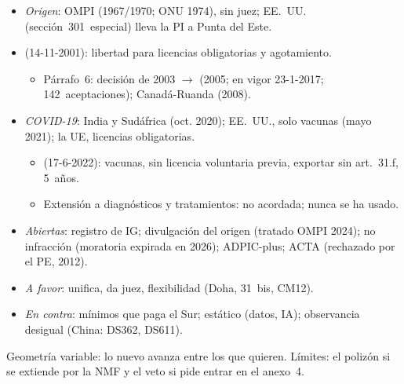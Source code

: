 \documentclass{article}
\begin{document}
\begin{columnas}
\begin{itemize}
\item \emph{Origen}: OMPI (1967/1970; ONU 1974), sin juez; EE.~UU. (sección~301~especial) lleva la PI a Punta del Este.
\item {} (14-11-2001): libertad para licencias obligatorias y agotamiento.
  \begin{itemize}
  \item Párrafo~6: decisión de 2003 $\to$  (2005; en vigor 23-1-2017; 142~aceptaciones); Canadá-Ruanda (2008).
  \end{itemize}
\item \emph{COVID-19}: India y Sudáfrica (oct. 2020); EE.~UU., solo vacunas (mayo 2021); la UE, licencias obligatorias.
  \begin{itemize}
  \item {} (17-6-2022): vacunas, sin licencia voluntaria previa, exportar sin art.~31.f, 5~años.
  \item Extensión a diagnósticos y tratamientos: no acordada; nunca se ha usado.
  \end{itemize}
\item \emph{Abiertas}: registro de IG; divulgación del origen (tratado OMPI 2024); no infracción (moratoria expirada en 2026); ADPIC-plus; ACTA (rechazado por el PE, 2012).
\end{itemize}

\begin{itemize}
\item \emph{A favor}: unifica, da juez, flexibilidad (Doha, 31~bis, CM12).
\item \emph{En contra}: mínimos que paga el Sur; estático (datos, IA); observancia desigual (China: DS362, DS611).
\end{itemize}

\begin{ideaclave}
Geometría variable: lo nuevo avanza entre los que quieren. Límites: el polizón si se extiende por la NMF y el veto si pide entrar en el anexo~4.
\end{ideaclave}


\end{columnas}
\end{document}
